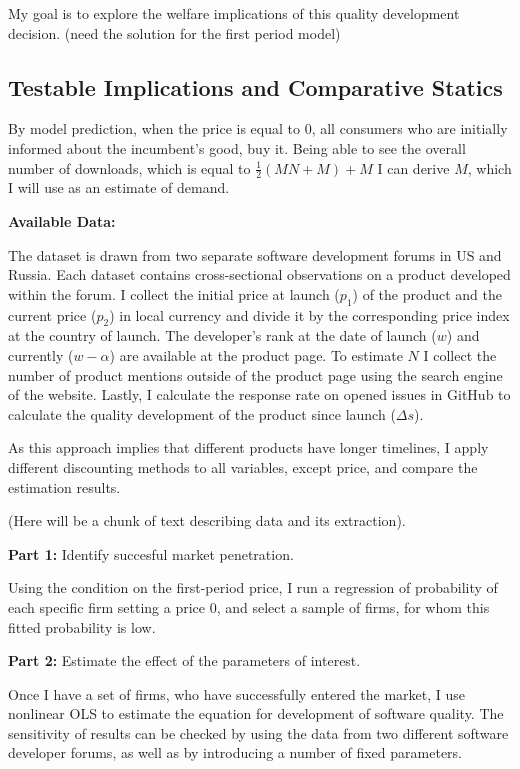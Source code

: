\documentclass{article}
\numberwithin{figure}{section}
\numberwithin{table}{section}
\theoremstyle{indented}
\numberwithin{equation}{section} %
\begin{document}
My goal is to explore the welfare implications of this quality development decision. (need the solution for the first period model)

\subsection{Testable Implications and Comparative Statics}

By model prediction, when the price is equal to 0, all consumers who are initially informed about the incumbent's good, buy it. Being able to see the overall number of downloads, which is equal to $\tfrac{1}{2}(MN+M) + M$ I can derive $M$, which I will use as an estimate of demand.  

\textbf{Available Data:} 

The dataset is drawn from two separate software development forums in US and Russia. Each dataset contains cross-sectional observations on a product developed within the forum. I collect the initial price at launch ($p_1$) of the product and the current price ($p_2$) in local currency and divide it by the corresponding price index at the country of launch. The developer's rank at the date of launch ($w$) and currently ($w-\alpha$) are available at the product page. To estimate $N$ I collect the number of product mentions outside of the product page using the search engine of the website. Lastly, I calculate the response rate on opened issues in GitHub to calculate the quality development of the product since launch ($\Delta s$).

As this approach implies that different products have longer timelines, I apply different discounting methods to all variables, except price, and compare the estimation results. 

(Here will be a chunk of text describing data and its extraction).



\textbf{Part 1:} Identify succesful market penetration.

Using the condition on the first-period price, I run a regression of probability of each specific firm setting a price 0, and select a sample of firms, for whom this fitted probability is low.

\textbf{Part 2:} Estimate the effect of the parameters of interest.

Once I have a set of firms, who have successfully entered the market, I use nonlinear OLS to estimate the equation for development of software quality. The sensitivity of results can be checked by using the data from two different software developer forums, as well as by introducing a number of fixed parameters. 
\end{document}
